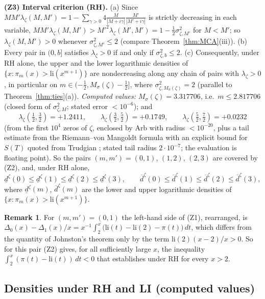 \documentclass[11pt]{amsart}
\theoremstyle{definition}
\newtheorem{remark}[theorem]{Remark}
\numberwithin{equation}{section}
\newcommand{\dlow}{\underline{d}}
\newcommand{\dup}{\overline{d}}
\begin{document}
\smallskip\noindent\textbf{(Z3) Interval criterion (RH).}
(a) Since $MM'\lambda_\zeta(M,M')
=1-\sum_{\gamma>0}4\frac{M}{|M+i\gamma|}\frac{M'}{|M'+i\gamma|}$ is
strictly decreasing in each variable,
$MM'\lambda_\zeta(M,M')>M'^2\lambda_\zeta(M',M')
=1-\tfrac12\sigma_{\zeta,M'}^2$ for $M<M'$; so
$\lambda_\zeta(M,M')>0$ whenever $\sigma_{\zeta,M'}^2\le2$ (compare
Theorem~\ref{thm:MCA}(iii)). (b) Every pair in $(0,b]$ satisfies
$\lambda_\zeta>0$ if and only if $\sigma_{\zeta,b}^2\le2$. (c)
Consequently, under RH alone, the upper and the lower logarithmic
densities of $\{x:\pi_m(x)>\mathrm{li}(x^{m+1})\}$ are nondecreasing
along any chain of pairs with $\lambda_\zeta>0$, in particular on
$m\in(-\tfrac12,M_\sigma(\zeta)-\tfrac12]$, where
$\sigma^2_{\zeta,M_\sigma(\zeta)}=2$ (parallel to
Theorem~\ref{thm:ties}(a)). \emph{Computed values:}
$M_\sigma(\zeta)=3.317706$, i.e.\ $m\le2.817706$ (closed form of
$\sigma_{\zeta,M}^2$; stated error $<10^{-6}$); and
\[
\lambda_\zeta(\tfrac12,\tfrac32)=+1.2411,\qquad
\lambda_\zeta(\tfrac32,\tfrac52)=+0.1749,\qquad
\lambda_\zeta(\tfrac52,\tfrac72)=+0.0232
\]
(from the first $10^4$ zeros of $\zeta$, enclosed by Arb with radius
$<10^{-20}$, plus a tail estimate from the Riemann--von Mangoldt
formula with an explicit bound for $S(T)$ quoted from Trudgian
\cite{Tru14}; stated tail radius $2\cdot10^{-7}$; the evaluation is
floating point). So the pairs $(m,m')=(0,1)$, $(1,2)$, $(2,3)$ are
covered by (Z2), and, under RH alone,
\[
\dlow^\zeta(0)\le\dlow^\zeta(1)\le\dlow^\zeta(2)\le\dlow^\zeta(3),
\qquad
\dup^\zeta(0)\le\dup^\zeta(1)\le\dup^\zeta(2)\le\dup^\zeta(3),
\]
where $\dlow^\zeta(m)$, $\dup^\zeta(m)$ are the lower and upper
logarithmic densities of $\{x:\pi_m(x)>\mathrm{li}(x^{m+1})\}$.

\begin{remark}\label{rem:zetaJohnston}
For $(m,m')=(0,1)$ the left-hand side of (Z1), rearranged, is
$\Delta_0(x)-\Delta_1(x)/x
=x^{-1}\int_2^x\bigl(\mathrm{li}(t)-\mathrm{li}(2)-\pi(t)\bigr)\,dt$,
which differs from the quantity of Johnston's theorem
\cite[Theorem~1.1]{Joh23} only by the term
$\mathrm{li}(2)(x-2)/x>0$. So for this pair (Z2) gives, for all
sufficiently large $x$, the inequality
$\int_2^x(\pi(t)-\mathrm{li}(t))\,dt<0$ that
\cite[Theorem~1.1]{Joh23} establishes under RH for every $x>2$.
\end{remark}

\subsection{Densities under RH and LI (computed values)}
\end{document}
